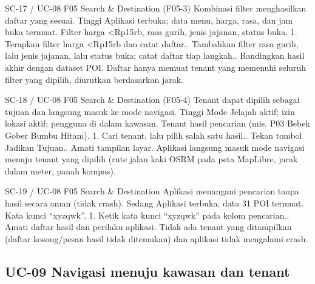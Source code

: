 \renewcommand{\tcactual}{Sesuai ekspektasi pada perangkat Android (Lolos via \texttt{04-search} (18/18) \& \texttt{search.test} (10/10)). Daftar hanya memuat tenant yang memenuhi seluruh filter yang dipilih, diurutkan berdasarkan jarak.}
{SC-17 / UC-08}
{F05 Search \& Destination}
{(F05-3) Kombinasi filter menghasilkan daftar yang sesuai.}
{Tinggi}
{Aplikasi terbuka; data menu, harga, rasa, dan jam buka termuat.}
{Filter harga <Rp15rb, rasa gurih, jenis jajanan, status buka.}
{1. Terapkan filter harga <Rp15rb dan catat daftar.. Tambahkan filter rasa gurih, lalu jenis jajanan, lalu status buka; catat daftar tiap langkah.. Bandingkan hasil akhir dengan dataset POI.}
{Daftar hanya memuat tenant yang memenuhi seluruh filter yang dipilih, diurutkan berdasarkan jarak.}

\renewcommand{\tcactual}{Sesuai ekspektasi pada perangkat Android. Aplikasi langsung masuk mode navigasi menuju tenant yang dipilih (rute jalan kaki OSRM pada peta MapLibre, jarak dalam meter, panah kompas).}
{SC-18 / UC-08}
{F05 Search \& Destination}
{(F05-4) Tenant dapat dipilih sebagai tujuan dan langsung masuk ke mode navigasi.}
{Tinggi}
{Mode Jelajah aktif; izin lokasi aktif; pengguna di dalam kawasan.}
{Tenant hasil pencarian (mis. P03 Bebek Gober Bumbu Hitam).}
{1. Cari tenant, lalu pilih salah satu hasil.. Tekan tombol Jadikan Tujuan.. Amati tampilan layar.}
{Aplikasi langsung masuk mode navigasi menuju tenant yang dipilih (rute jalan kaki OSRM pada peta MapLibre, jarak dalam meter, panah kompas).}

\renewcommand{\tcactual}{Sesuai ekspektasi pada perangkat Android (Lolos via \texttt{04-search} (18/18) \& \texttt{search.test} (10/10)). Tidak ada tenant yang ditampilkan (daftar kosong/pesan hasil tidak ditemukan) dan aplikasi tidak mengalami crash.}
{SC-19 / UC-08}
{F05 Search \& Destination}
{Aplikasi menangani pencarian tanpa hasil secara aman (tidak crash).}
{Sedang}
{Aplikasi terbuka; data 31 POI termuat.}
{Kata kunci ``xyzqwk''.}
{1. Ketik kata kunci ``xyzqwk'' pada kolom pencarian.. Amati daftar hasil dan perilaku aplikasi.}
{Tidak ada tenant yang ditampilkan (daftar kosong/pesan hasil tidak ditemukan) dan aplikasi tidak mengalami crash.}

\subsection*{UC-09 Navigasi menuju kawasan dan tenant}

